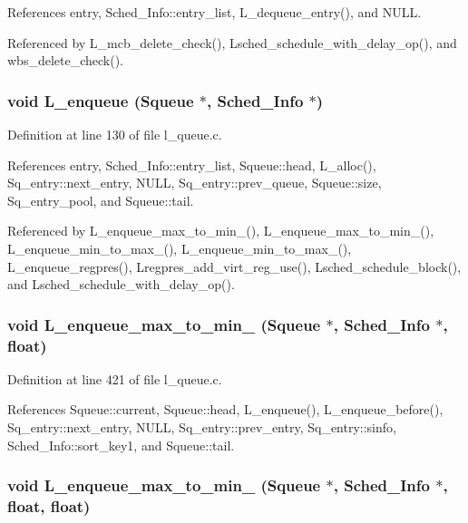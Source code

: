 References entry, Sched\_\-Info::entry\_\-list, L\_\-dequeue\_\-entry(), and NULL.

Referenced by L\_\-mcb\_\-delete\_\-check(), Lsched\_\-schedule\_\-with\_\-delay\_\-op(), and wbs\_\-delete\_\-check().
\subsubsection{\setlength{\rightskip}{0pt plus 5cm}void L\_\-enqueue (\bf{Squeue} $\ast$, \bf{Sched\_\-Info} $\ast$)}\label{l__schedule_8h_4946e9588196557d185aee160616ad87}




Definition at line 130 of file l\_\-queue.c.

References entry, Sched\_\-Info::entry\_\-list, Squeue::head, L\_\-alloc(), Sq\_\-entry::next\_\-entry, NULL, Sq\_\-entry::prev\_\-queue, Squeue::size, Sq\_\-entry\_\-pool, and Squeue::tail.

Referenced by L\_\-enqueue\_\-max\_\-to\_\-min\_(), L\_\-enqueue\_\-max\_\-to\_\-min\_(), L\_\-enqueue\_\-min\_\-to\_\-max\_(), L\_\-enqueue\_\-min\_\-to\_\-max\_(), L\_\-enqueue\_\-regpres(), Lregpres\_\-add\_\-virt\_\-reg\_\-use(), Lsched\_\-schedule\_\-block(), and Lsched\_\-schedule\_\-with\_\-delay\_\-op().
\subsubsection{\setlength{\rightskip}{0pt plus 5cm}void L\_\-enqueue\_\-max\_\-to\_\-min\_ (\bf{Squeue} $\ast$, \bf{Sched\_\-Info} $\ast$, float)}\label{l__schedule_8h_e8b74658cb198f513e583544417d62f8}




Definition at line 421 of file l\_\-queue.c.

References Squeue::current, Squeue::head, L\_\-enqueue(), L\_\-enqueue\_\-before(), Sq\_\-entry::next\_\-entry, NULL, Sq\_\-entry::prev\_\-entry, Sq\_\-entry::sinfo, Sched\_\-Info::sort\_\-key1, and Squeue::tail.
\subsubsection{\setlength{\rightskip}{0pt plus 5cm}void L\_\-enqueue\_\-max\_\-to\_\-min\_ (\bf{Squeue} $\ast$, \bf{Sched\_\-Info} $\ast$, float, float)}\label{l__schedule_8h_1963c4e3ecf49853a303b4c218258b99}




